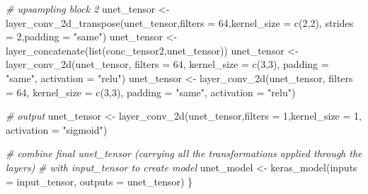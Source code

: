 \documentclass[
]{article}
\newenvironment{Shaded}{\begin{snugshade}}{\end{snugshade}}
\newcommand{\AttributeTok}[1]{\textcolor[rgb]{0.77,0.63,0.00}{#1}}
\newcommand{\CommentTok}[1]{\textcolor[rgb]{0.56,0.35,0.01}{\textit{#1}}}
\newcommand{\DecValTok}[1]{\textcolor[rgb]{0.00,0.00,0.81}{#1}}
\newcommand{\FunctionTok}[1]{\textcolor[rgb]{0.00,0.00,0.00}{#1}}
\newcommand{\NormalTok}[1]{#1}
\newcommand{\OtherTok}[1]{\textcolor[rgb]{0.56,0.35,0.01}{#1}}
\newcommand{\StringTok}[1]{\textcolor[rgb]{0.31,0.60,0.02}{#1}}
\begin{document}
\begin{Shaded}
\begin{Highlighting}[]
  \CommentTok{\# upsampling block 2}
\NormalTok{  unet\_tensor }\OtherTok{\textless{}{-}} \FunctionTok{layer\_conv\_2d\_transpose}\NormalTok{(unet\_tensor,}\AttributeTok{filters =} \DecValTok{64}\NormalTok{,}\AttributeTok{kernel\_size =} \FunctionTok{c}\NormalTok{(}\DecValTok{2}\NormalTok{,}\DecValTok{2}\NormalTok{),}
                                         \AttributeTok{strides =} \DecValTok{2}\NormalTok{,}\AttributeTok{padding =} \StringTok{"same"}\NormalTok{)}
\NormalTok{  unet\_tensor }\OtherTok{\textless{}{-}} \FunctionTok{layer\_concatenate}\NormalTok{(}\FunctionTok{list}\NormalTok{(conc\_tensor2,unet\_tensor))}
\NormalTok{  unet\_tensor }\OtherTok{\textless{}{-}} \FunctionTok{layer\_conv\_2d}\NormalTok{(unet\_tensor, }\AttributeTok{filters =} \DecValTok{64}\NormalTok{, }\AttributeTok{kernel\_size =} \FunctionTok{c}\NormalTok{(}\DecValTok{3}\NormalTok{,}\DecValTok{3}\NormalTok{),}
                               \AttributeTok{padding =} \StringTok{"same"}\NormalTok{, }\AttributeTok{activation =} \StringTok{"relu"}\NormalTok{)}
\NormalTok{  unet\_tensor }\OtherTok{\textless{}{-}} \FunctionTok{layer\_conv\_2d}\NormalTok{(unet\_tensor, }\AttributeTok{filters =} \DecValTok{64}\NormalTok{, }\AttributeTok{kernel\_size =} \FunctionTok{c}\NormalTok{(}\DecValTok{3}\NormalTok{,}\DecValTok{3}\NormalTok{),}
                               \AttributeTok{padding =} \StringTok{"same"}\NormalTok{, }\AttributeTok{activation =} \StringTok{"relu"}\NormalTok{)}
  
  \CommentTok{\# output}
\NormalTok{  unet\_tensor }\OtherTok{\textless{}{-}} \FunctionTok{layer\_conv\_2d}\NormalTok{(unet\_tensor,}\AttributeTok{filters =} \DecValTok{1}\NormalTok{,}\AttributeTok{kernel\_size =} \DecValTok{1}\NormalTok{, }
                               \AttributeTok{activation =} \StringTok{"sigmoid"}\NormalTok{)}
  
  \CommentTok{\# combine final unet\_tensor (carrying all the transformations applied through the layers)}
  \CommentTok{\# with input\_tensor to create model}
\NormalTok{  unet\_model }\OtherTok{\textless{}{-}} \FunctionTok{keras\_model}\NormalTok{(}\AttributeTok{inputs =}\NormalTok{ input\_tensor, }\AttributeTok{outputs =}\NormalTok{ unet\_tensor)}
\NormalTok{\}}
\end{Highlighting}
\end{Shaded}
\end{document}
